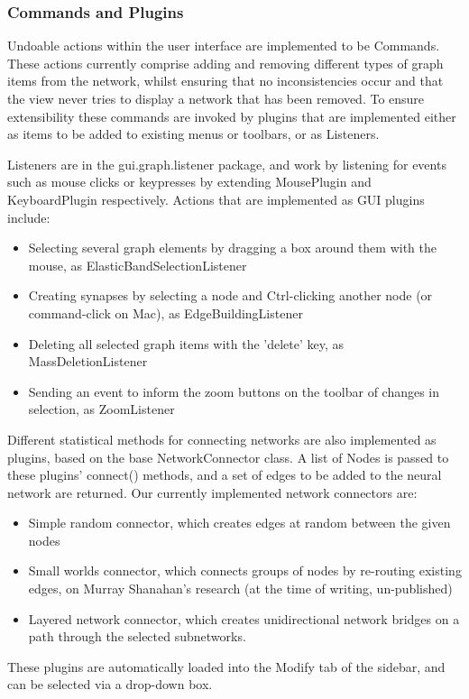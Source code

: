 \documentclass{acm_proc_article-sp}
\begin{document}
\subsubsection{Commands and Plugins}
{
Undoable actions within the user interface are implemented to be Commands. These actions currently comprise adding and removing different types of graph items from the network, whilst ensuring that no inconsistencies occur and that the view never tries to display a network that has been removed. To ensure extensibility these commands are invoked by plugins that are implemented either as items to be added to existing menus or toolbars, or as Listeners.

Listeners are in the gui.graph.listener package, and work by listening for events such as mouse clicks or keypresses by extending MousePlugin and KeyboardPlugin respectively. Actions that are implemented as GUI plugins include:
\begin{itemize}
\item{
Selecting several graph elements by dragging a box around them with the mouse, as ElasticBandSelectionListener
}
\item{
Creating synapses by selecting a node and Ctrl-clicking another node (or command-click on Mac), as EdgeBuildingListener
}
\item{
Deleting all selected graph items with the 'delete' key, as MassDeletionListener
}
\item{
Sending an event to inform the zoom buttons on the toolbar of changes in selection, as ZoomListener
}
\end{itemize}

Different statistical methods for connecting networks are also implemented as plugins, based on the base NetworkConnector class. A list of Nodes is passed to these plugins' connect() methods, and a set of edges to be added to the neural network are returned. Our currently implemented network connectors are:
\begin{itemize}
\item{
Simple random connector, which creates edges at random between the given nodes
}
\item{
Small worlds connector, which connects groups of nodes by re-routing existing edges, on Murray Shanahan's research (at the time of writing, un{}-published)
}
\item{
Layered network connector, which creates unidirectional network bridges on a path through the selected subnetworks.
}
\end{itemize}

These plugins are automatically loaded into the Modify tab of the sidebar, and can be selected via a drop-down box.
}
\end{document}
